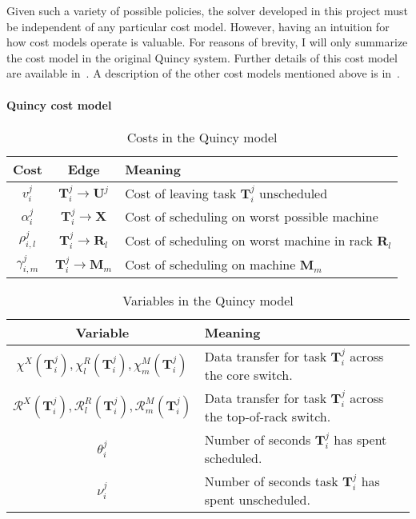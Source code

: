 Given such a variety of possible policies, the solver developed in this project must be independent of any particular cost model. However, having an intuition for how cost models operate is valuable. For reasons of brevity, I will only summarize the cost model in the original Quincy system. Further details of this cost model are available in~\cite{Isard:2009}. A description of the other cost models mentioned above is in~\cite[ch.~5]{Schwarzkopf:2015}.

\paragraph{Quincy cost model}
\begin{table}
    \begin{tabular}{c|c|l}
        \hline 
        Cost & Edge & Meaning\tabularnewline
        \hline 
        \hline 
        $v_{i}^{j}$ & $\mathbf{T}_{i}^{j}\to\mathbf{U}^{j}$ & Cost of leaving task $\mathbf{T}_{i}^{j}$ unscheduled\tabularnewline
        \hline 
        $\alpha_{i}^{j}$ & $\mathbf{T}_{i}^{j}\to\mathbf{X}$ & Cost of scheduling on worst possible machine\tabularnewline
        \hline 
        $\rho_{i,l}^{j}$ & $\mathbf{T}_{i}^{j}\to\mathbf{R}_{l}$ & Cost of scheduling on worst machine in rack $\mathbf{R}_{l}$\tabularnewline
        \hline 
        $\gamma_{i,m}^{j}$ & $\mathbf{T}_{i}^{j}\to\mathbf{M}_{m}$ & Cost of scheduling on machine $\mathbf{M}_{m}$\tabularnewline
        \hline 
    \end{tabular}
    \caption{Costs in the Quincy model}
    \label{table:quincy-costs}
\end{table}

\begin{table}
    \begin{tabular}{c|l}
        \hline 
        Variable & Meaning\tabularnewline
        \hline 
        $\chi^{X}\left(\mathbf{T}_{i}^{j}\right),\chi_{l}^{R}\left(\mathbf{T}_{i}^{j}\right),\chi_{m}^{M}\left(\mathbf{T}_{i}^{j}\right)$ & Data transfer for task $\mathbf{T}_{i}^{j}$ across the core switch.\tabularnewline %
        $\mathcal{R}^{X}\left(\mathbf{T}_{i}^{j}\right),\mathcal{R}_{l}^{R}\left(\mathbf{T}_{i}^{j}\right),\mathcal{R}_{m}^{M}\left(\mathbf{T}_{i}^{j}\right)$ & Data transfer for task $\mathbf{T}_{i}^{j}$ across the top-of-rack switch.\tabularnewline
        $\theta_{i}^{j}$ & Number of seconds $\mathbf{T}_{i}^{j}$ has spent scheduled.\tabularnewline
        $\nu_{i}^{j}$ & Number of seconds task $\mathbf{T}_{i}^{j}$ has spent unscheduled.\tabularnewline
        \hline
    \end{tabular}
    \caption{Variables in the Quincy model}
    \label{table:quincy-variables}
\end{table}

